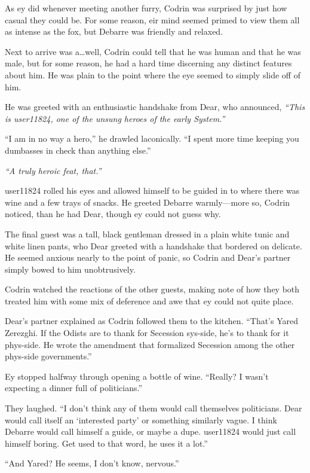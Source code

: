 As ey did whenever meeting another furry, Codrin was surprised by just how casual they could be. For some reason, eir mind seemed primed to view them all as intense as the fox, but Debarre was friendly and relaxed.

Next to arrive was a\ldots well, Codrin could tell that he was human and that he was male, but for some reason, he had a hard time discerning any distinct features about him. He was plain to the point where the eye seemed to simply slide off of him.

He was greeted with an enthusiastic handshake from Dear, who announced, \emph{``This is user11824, one of the unsung heroes of the early System.''}

``I am in no way a hero,'' he drawled laconically. ``I spent more time keeping you dumbasses in check than anything else.''

\emph{``A truly heroic feat, that.''}

user11824 rolled his eyes and allowed himself to be guided in to where there was wine and a few trays of snacks. He greeted Debarre warmly---more so, Codrin noticed, than he had Dear, though ey could not guess why.

The final guest was a tall, black gentleman dressed in a plain white tunic and white linen pants, who Dear greeted with a handshake that bordered on delicate. He seemed anxious nearly to the point of panic, so Codrin and Dear's partner simply bowed to him unobtrusively.

Codrin watched the reactions of the other guests, making note of how they both treated him with some mix of deference and awe that ey could not quite place.

Dear's partner explained as Codrin followed them to the kitchen. ``That's Yared Zerezghi. If the Odists are to thank for Secession sys-side, he's to thank for it phys-side. He wrote the amendment that formalized Secession among the other phys-side governments.''

Ey stopped halfway through opening a bottle of wine. ``Really? I wasn't expecting a dinner full of politicians.''

They laughed. ``I don't think any of them would call themselves politicians. Dear would call itself an `interested party' or something similarly vague. I think Debarre would call himself a guide, or maybe a dupe. user11824 would just call himself boring. Get used to that word, he uses it a lot.''

``And Yared? He seems, I don't know, nervous.''

